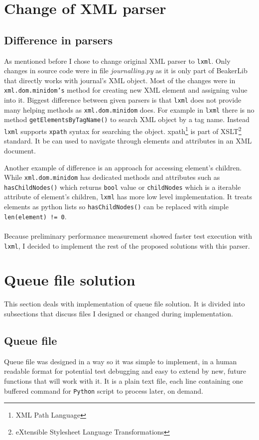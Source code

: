 \section{Change of XML parser}
\subsection{Difference in parsers}
As mentioned before I chose to change original XML parser to \texttt{lxml}. Only changes in source code were in file \textit{journalling.py} as it is only part of BeakerLib that directly works with journal's XML object. 
Most of the changes were in \texttt{xml.dom.minidom's} method for creating new XML element and assigning value into it.
Biggest difference between given parsers is that \texttt{lxml} does not provide many helping methods as \texttt{xml.dom.minidom} does.
For example in \texttt{lxml}  there is no method \texttt{getElementsByTagName()} to search XML object by a tag name. Instead \texttt{lxml} supports \texttt{xpath}\cite{xpath} syntax for searching the object. xpath\footnote{XML Path Language} is part of XSLT\footnote{eXtensible Stylesheet Language Transformations} standard. It be can used to navigate through elements and attributes in an XML document.

Another example of difference is an approach for accessing element's children. While \texttt{xml.dom.minidom} has dedicated methods and attributes such as \texttt{hasChildNodes()} which returns \texttt{bool} value or \texttt{childNodes} which is a iterable attribute of element's children, \texttt{lxml} has more low level implementation. It treats elements as python lists so \texttt{hasChildNodes()} can be replaced with simple \texttt{len(element) != 0}.
\\
\\
Because preliminary performance measurement showed faster test execution with \texttt{lxml}, I decided to implement the rest of the proposed solutions with this parser.

\section{Queue file solution}
This section deals with implementation of queue file solution. It is divided into subsections that discuss files I designed or changed during implementation. 

\subsection{Queue file}
Queue file was designed in a way so it was simple to implement, in a human readable format for potential test debugging and easy to extend by new, future functions that will work with it. 
It is a plain text file, each line containing one buffered command for \texttt{Python} script to process later, on demand. 

